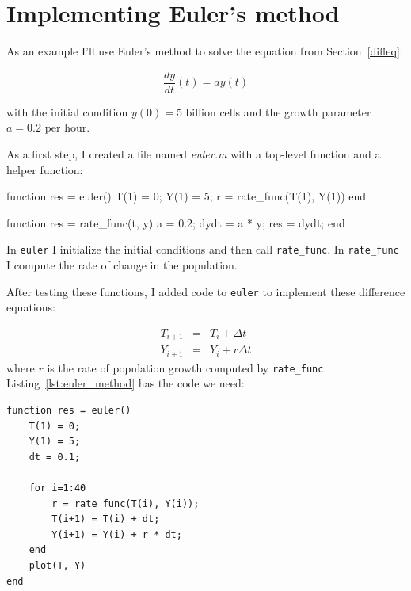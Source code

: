 

\section{Implementing Euler's method}

As an example I'll use Euler's method to solve the equation from Section~\ref{diffeq}:

\[ \frac{dy}{dt}(t) = a y(t) \]

with the initial condition $y(0) = 5$ billion cells and
the growth parameter $a = 0.2$ per hour. 


As a first step, I created a file named {\em euler.m} with a top-level function and a helper function:

\begin{code}
function res = euler()
    T(1) = 0;
    Y(1) = 5;
    r = rate_func(T(1), Y(1))
end

function res = rate_func(t, y)
   a = 0.2;
   dydt = a * y;
   res = dydt;
end
\end{code}

In {\tt euler} I initialize the initial conditions and then call \verb"rate_func".  In \verb"rate_func" I compute the rate of change in the population.


After testing these functions, I added code to {\tt euler} to implement these difference equations:

\begin{eqnarray}
T_{i+1} &=& T_i + \Delta t             \\
Y_{i+1} &=& Y_i + r \Delta t          
\end{eqnarray}
%
where $r$ is the rate of population growth computed by \verb"rate_func".
Listing~\ref{lst:euler_method} has the code we need:

\begin{lstlisting}[caption={A function implementing Euler's method}, label={lst:euler_method}]
function res = euler()
    T(1) = 0;
    Y(1) = 5;
    dt = 0.1;
    
    for i=1:40
        r = rate_func(T(i), Y(i));
        T(i+1) = T(i) + dt;
        Y(i+1) = Y(i) + r * dt;
    end
    plot(T, Y)
end
\end{lstlisting}

